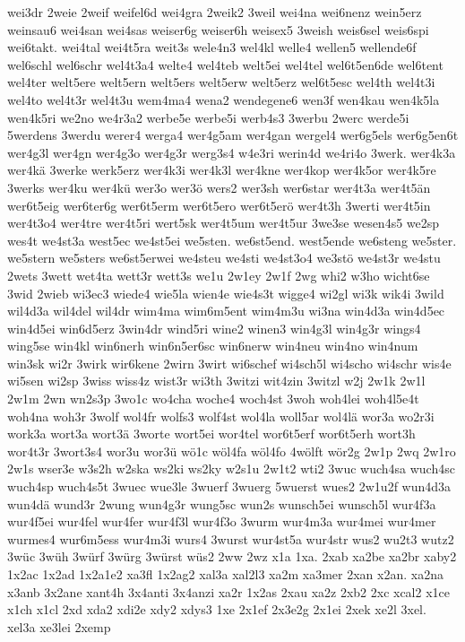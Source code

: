 {wei3dr
2weie
2weif
weifel6d
wei4gra
2weik2
3weil
wei4na
wei6nenz
wein5erz
weinsau6
wei4san
wei4sas
weiser6g
weiser6h
weisex5
3weish
weis6sel
weis6spi
wei6takt.
wei4tal
wei4t5ra
weit3s
wele4n3
wel4kl
welle4
wellen5
wellende6f
wel6schl
wel6schr
wel4t3a4
welte4
wel4teb
welt5ei
wel4tel
wel6t5en6de
wel6tent
wel4ter
welt5ere
welt5ern
welt5ers
welt5erw
welt5erz
wel6t5esc
wel4th
wel4t3i
wel4to
wel4t3r
wel4t3u
wem4ma4
wena2
wendegene6
wen3f
wen4kau
wen4k5la
wen4k5ri
we2no
we4r3a2
werbe5e
werbe5i
werb4s3
3werbu
2werc
werde5i
5werdens
3werdu
werer4
werga4
wer4g5am
wer4gan
wergel4
wer6g5els
wer6g5en6t
wer4g3l
wer4gn
wer4g3o
wer4g3r
werg3s4
w4e3ri
werin4d
we4ri4o
3werk.
wer4k3a
wer4kä
3werke
werk5erz
wer4k3i
wer4k3l
wer4kne
wer4kop
wer4k5or
wer4k5re
3werks
wer4ku
wer4kü
wer3o
wer3ö
wers2
wer3sh
wer6star
wer4t3a
wer4t5än
wer6t5eig
wer6ter6g
wer6t5erm
wer6t5ero
wer6t5erö
wer4t3h
3werti
wer4t5in
wer4t3o4
wer4tre
wer4t5ri
wert5sk
wer4t5um
wer4t5ur
3we3se
wesen4s5
we2sp
wes4t
we4st3a
west5ec
we4st5ei
we5sten.
we6st5end.
west5ende
we6steng
we5ster.
we5stern
we5sters
we6st5erwei
we4steu
we4sti
we4st3o4
we3stö
we4st3r
we4stu
2wets
3wett
wet4ta
wett3r
wett3s
we1u
2w1ey
2w1f
2wg
whi2
w3ho
wicht6se
3wid
2wieb
wi3ec3
wiede4
wie5la
wien4e
wie4s3t
wigge4
wi2gl
wi3k
wik4i
3wild
wil4d3a
wil4del
wil4dr
wim4ma
wim6m5ent
wim4m3u
wi3na
win4d3a
win4d5ec
win4d5ei
win6d5erz
3win4dr
wind5ri
wine2
winen3
win4g3l
win4g3r
wings4
wing5se
win4kl
win6nerh
win6n5er6sc
win6nerw
win4neu
win4no
win4num
win3sk
wi2r
3wirk
wir6kene
2wirn
3wirt
wi6schef
wi4sch5l
wi4scho
wi4schr
wis4e
wi5sen
wi2sp
3wiss
wiss4z
wist3r
wi3th
3witzi
wit4zin
3witzl
w2j
2w1k
2w1l
2w1m
2wn
wn2s3p
3wo1c
wo4cha
woche4
woch4st
3woh
woh4lei
woh4l5e4t
woh4na
woh3r
3wolf
wol4fr
wolfs3
wolf4st
wol4la
woll5ar
wol4lä
wor3a
wo2r3i
work3a
wort3a
wort3ä
3worte
wort5ei
wor4tel
wor6t5erf
wor6t5erh
wort3h
wor4t3r
3wort3s4
wor3u
wor3ü
wö1c
wöl4fa
wöl4fo
4wölft
wör2g
2w1p
2wq
2w1ro
2w1s
wser3e
w3s2h
w2ska
ws2ki
ws2ky
w2s1u
2w1t2
wti2
3wuc
wuch4sa
wuch4sc
wuch4sp
wuch4s5t
3wuec
wue3le
3wuerf
3wuerg
5wuerst
wues2
2w1u2f
wun4d3a
wun4dä
wund3r
2wung
wun4g3r
wung5sc
wun2s
wunsch5ei
wunsch5l
wur4f3a
wur4f5ei
wur4fel
wur4fer
wur4f3l
wur4f3o
3wurm
wur4m3a
wur4mei
wur4mer
wurmes4
wur6m5ess
wur4m3i
wurs4
3wurst
wur4st5a
wur4str
wus2
wu2t3
wutz2
3wüc
3wüh
3würf
3würg
3würst
wüs2
2ww
2wz
x1a
1xa.
2xab
xa2be
xa2br
xaby2
1x2ac
1x2ad
1x2a1e2
xa3fl
1x2ag2
xal3a
xal2l3
xa2m
xa3mer
2xan
x2an.
xa2na
x3anb
3x2ane
xant4h
3x4anti
3x4anzi
xa2r
1x2as
2xau
xa2z
2xb2
2xc
xcal2
x1ce
x1ch
x1cl
2xd
xda2
xdi2e
xdy2
xdys3
1xe
2x1ef
2x3e2g
2x1ei
2xek
xe2l
3xel.
xel3a
xe3lei
2xemp
}
